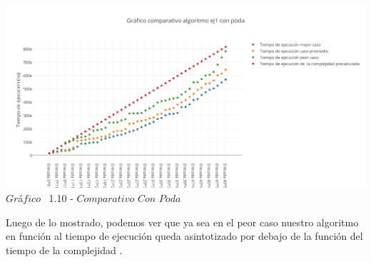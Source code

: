   \vspace*{0.3cm} \vspace*{0.3cm}
  \begin{center}
\includegraphics[scale=0.65]{./EJ1/comparativo1.png}
{$Gr$\'a$fico$ \ 1.10 - $Comparativo$ $Con$ $Poda$}
  \end{center}
  \vspace*{0.3cm}


Luego de lo mostrado, podemos ver que ya sea en el peor caso nuestro algoritmo en funci\'on al tiempo de ejecuci\'on queda asintotizado por debajo de la funci\'on del tiempo de la complejidad .